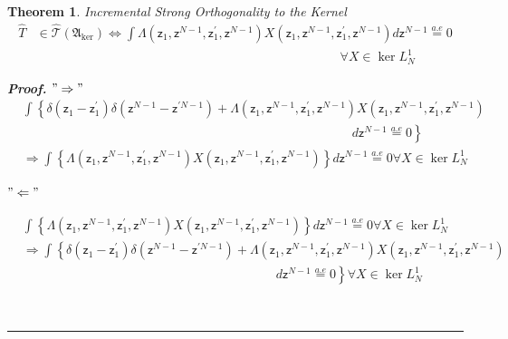 \documentclass[aps,preprint]{revtex4}%
\newtheorem{theorem}{Theorem}
\newenvironment{proof}[1][Proof]{\noindent\textbf{#1.} }{\ \rule{0.5em}{0.5em}}
\begin{document}
\begin{theorem}
Incremental Strong Orthogonality to the Kernel
\begin{align}
\hat{T}  &  \in\mathcal{\hat{T}}\left(  \mathfrak{A}_{\ker}\right)
\Leftrightarrow%
{\displaystyle\int}
\Lambda\left(  \mathsf{z}_{1},\mathsf{z}^{N-1},\mathsf{z}_{1}^{\prime
},\mathsf{z}^{N-1}\right)  X\left(  \mathsf{z}_{1},\mathsf{z}^{N-1}%
,\mathsf{z}_{1}^{\prime},\mathsf{z}^{N-1}\right)  d\mathsf{z}^{N-1}%
\overset{a.e}{=}0\nonumber\\
&  \qquad\qquad\qquad\qquad\qquad\qquad\qquad\qquad\qquad\qquad\qquad
\qquad\forall X\in\ker L_{N}^{1}%
\end{align}


\begin{proof}
$"\Rightarrow"$%
\begin{align}
&
{\displaystyle\int}
\left\{  \delta\left(  \mathsf{z}_{1}-\mathsf{z}_{1}^{\prime}\right)
\delta\left(  \mathsf{z}^{N-1}-\mathsf{z}^{\prime N-1}\right)  +\Lambda\left(
\mathsf{z}_{1},\mathsf{z}^{N-1},\mathsf{z}_{1}^{\prime},\mathsf{z}%
^{N-1}\right)  X\left(  \mathsf{z}_{1},\mathsf{z}^{N-1},\mathsf{z}_{1}%
^{\prime},\mathsf{z}^{N-1}\right)  \right. \nonumber\\
&  \qquad\qquad\qquad\qquad\qquad\qquad\qquad\qquad\qquad\qquad\qquad
\qquad\qquad\left.  d\mathsf{z}^{N-1}\overset{a.e}{=}0\right\} \nonumber\\
&  \Rightarrow%
{\displaystyle\int}
\left\{  \Lambda\left(  \mathsf{z}_{1},\mathsf{z}^{N-1},\mathsf{z}_{1}%
^{\prime},\mathsf{z}^{N-1}\right)  X\left(  \mathsf{z}_{1},\mathsf{z}%
^{N-1},\mathsf{z}_{1}^{\prime},\mathsf{z}^{N-1}\right)  \right\}
d\mathsf{z}^{N-1}\overset{a.e}{=}0\forall X\in\ker L_{N}^{1}%
\end{align}


$"\Leftarrow"$%

\begin{align}
&
{\displaystyle\int}
\left\{  \Lambda\left(  \mathsf{z}_{1},\mathsf{z}^{N-1},\mathsf{z}_{1}%
^{\prime},\mathsf{z}^{N-1}\right)  X\left(  \mathsf{z}_{1},\mathsf{z}%
^{N-1},\mathsf{z}_{1}^{\prime},\mathsf{z}^{N-1}\right)  \right\}
d\mathsf{z}^{N-1}\overset{a.e}{=}0\forall X\in\ker L_{N}^{1}\nonumber\\
&  \Rightarrow%
{\displaystyle\int}
\left\{  \delta\left(  \mathsf{z}_{1}-\mathsf{z}_{1}^{\prime}\right)
\delta\left(  \mathsf{z}^{N-1}-\mathsf{z}^{\prime N-1}\right)  +\Lambda\left(
\mathsf{z}_{1},\mathsf{z}^{N-1},\mathsf{z}_{1}^{\prime},\mathsf{z}%
^{N-1}\right)  X\left(  \mathsf{z}_{1},\mathsf{z}^{N-1},\mathsf{z}_{1}%
^{\prime},\mathsf{z}^{N-1}\right)  \right. \nonumber\\
&  \qquad\qquad\qquad\qquad\qquad\qquad\qquad\qquad\qquad\qquad\left.
d\mathsf{z}^{N-1}\overset{a.e}{=}0\right\}  \forall X\in\ker L_{N}^{1}%
\end{align}

\end{proof}
\end{theorem}
\end{document}
